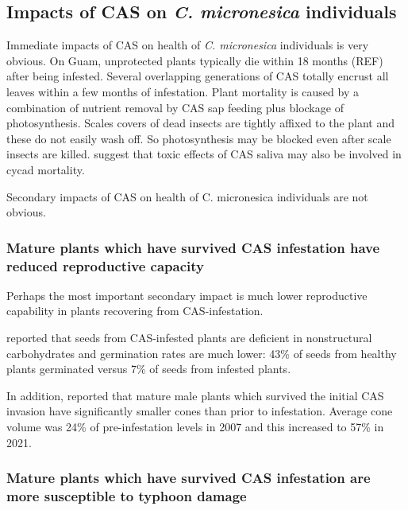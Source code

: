 \documentclass[12pt,letterpaper,english,bibliography=totocnumbered, abstract=on]{scrartcl}
\begin{document}

\subsection{Impacts of CAS on \textit{C. micronesica} individuals}

Immediate impacts of CAS on health of \textit{C. micronesica} individuals is very obvious. On Guam, unprotected plants typically die within 18 months (REF) after being infested. Several overlapping generations of CAS totally encrust all leaves within a few months of infestation. Plant mortality is caused by a combination of nutrient removal by CAS sap feeding plus blockage of photosynthesis. Scales covers of dead insects are tightly affixed to the plant and these do not easily wash off. So photosynthesis may be blocked even after scale insects are killed. \cite{muniappanCycadAulacaspisScale2012} suggest that toxic effects of CAS saliva may also be involved in cycad mortality. 


Secondary impacts of CAS on health of C. micronesica individuals are not obvious.

\subsubsection{Mature plants which have survived CAS infestation have reduced reproductive capacity}

Perhaps the most important secondary impact is much lower reproductive capability in plants recovering from CAS-infestation.  

\cite{marlerSourceSinkRelations2019} reported that seeds from CAS-infested plants are deficient in nonstructural carbohydrates  and germination rates are much lower: 43\% of seeds from healthy plants germinated versus 7\% of seeds from infested plants.

In addition, \cite{marlerAulacaspisYasumatsuiInvasion2021} reported that mature male plants which survived the initial CAS invasion have significantly smaller cones than prior to infestation. Average cone volume was 24\% of pre-infestation levels in 2007 and this increased to 57\% in 2021.

\subsubsection{Mature plants which have survived CAS infestation are more susceptible to typhoon damage}  
\end{document}
